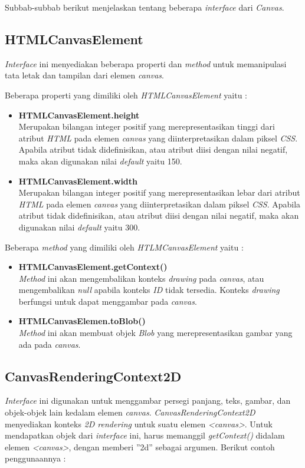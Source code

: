Subbab-subbab berikut menjelaskan tentang beberapa \textit{interface} dari \textit{Canvas}.

\subsection{HTMLCanvasElement}
\textit{Interface} ini menyediakan beberapa properti dan \textit{method} untuk memanipulasi tata letak dan tampilan dari elemen \textit{canvas}.

Beberapa properti yang dimiliki oleh \textit{HTMLCanvasElement} yaitu : 

\begin{itemize}
	\item \textbf{HTMLCanvasElement.height} \\ Merupakan bilangan integer positif yang merepresentasikan tinggi dari atribut \textit{HTML} pada elemen \textit{canvas} yang diinterpretasikan dalam piksel \textit{CSS}. Apabila atribut tidak didefinisikan, atau atribut diisi dengan nilai negatif, maka akan digunakan nilai \textit{default} yaitu 150.
	\item \textbf{HTMLCanvasElement.width} \\ Merupakan bilangan integer positif yang merepresentasikan lebar dari atribut \textit{HTML} pada elemen \textit{canvas} yang diinterpretasikan dalam piksel \textit{CSS}. Apabila atribut tidak didefinisikan, atau atribut diisi dengan nilai negatif, maka akan digunakan nilai \textit{default} yaitu 300.
\end{itemize}

Beberapa \textit{method} yang dimiliki oleh \textit{HTLMCanvasElement} yaitu : 

\begin{itemize}
	\item \textbf{HTMLCanvasElement.getContext()} \\ \textit{Method} ini akan mengembalikan konteks \textit{drawing} pada \textit{canvas}, atau mengembalikan \textit{null} apabila konteks \textit{ID} tidak tersedia. Konteks \textit{drawing} berfungsi untuk dapat menggambar pada \textit{canvas}.
	\item \textbf{HTMLCanvasElemen.toBlob()} \\ \textit{Method} ini akan membuat objek \textit{Blob} yang merepresentasikan gambar yang ada pada \textit{canvas}. 
	
\end{itemize}


\subsection{CanvasRenderingContext2D}
\textit{Interface} ini digunakan untuk menggambar persegi panjang, teks, gambar, dan objek-objek lain kedalam elemen \textit{canvas}. \textit{CanvasRenderingContext2D} menyediakan konteks \textit{2D rendering} untuk suatu elemen \textit{<canvas>}.
Untuk mendapatkan objek dari \textit{interface} ini, harus memanggil \textit{getContext()} didalam elemen \textit{<canvas>}, dengan memberi ''2d'' sebagai argumen. Berikut contoh penggunaannya :

